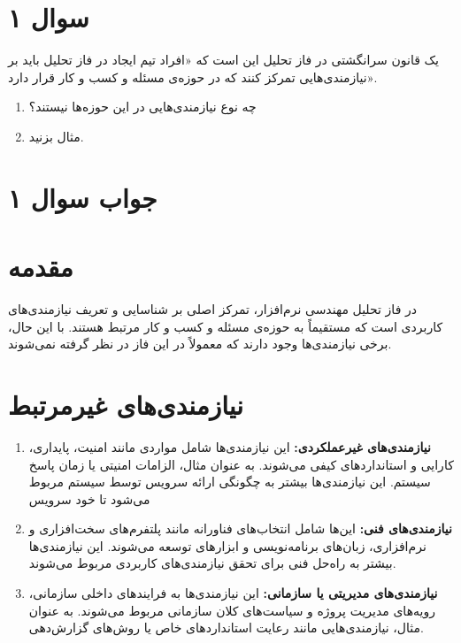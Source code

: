 \section*{سوال ۱}

یک قانون سرانگشتی در فاز تحلیل این است که «افراد تیم ایجاد در فاز تحلیل باید بر نیازمندی‌هایی تمرکز کنند که در حوزه‌ی مسئله و کسب و کار قرار دارد».
\begin{enumerate}
	\item چه نوع نیازمندی‌هایی در این حوزه‌ها نیستند؟
	\item مثال بزنید.
\end{enumerate}

\section*{جواب سوال ۱}

\section*{مقدمه}
در فاز تحلیل مهندسی نرم‌افزار، تمرکز اصلی بر شناسایی و تعریف نیازمندی‌های کاربردی است که مستقیماً به حوزه‌ی مسئله و کسب و کار مرتبط هستند. با این حال، برخی نیازمندی‌ها وجود دارند که معمولاً در این فاز در نظر گرفته نمی‌شوند.

\section*{نیازمندی‌های غیرمرتبط}
\begin{enumerate}
	
	\item \textbf{نیازمندی‌های غیرعملکردی:} این نیازمندی‌ها شامل مواردی مانند امنیت، پایداری، کارایی و استانداردهای کیفی می‌شوند. به عنوان مثال، الزامات امنیتی یا زمان پاسخ سیستم. این نیازمندی‌ها بیشتر به چگونگی ارائه سرویس توسط سیستم مربوط می‌شود تا خود سرویس
	
	\item \textbf{نیازمندی‌های فنی:} این‌ها شامل انتخاب‌های فناورانه مانند پلتفرم‌های سخت‌افزاری و نرم‌افزاری، زبان‌های برنامه‌نویسی و ابزارهای توسعه می‌شوند. این نیازمندی‌ها بیشتر به راه‌حل فنی برای تحقق نیازمندی‌های کاربردی مربوط می‌شوند.
	
	\item \textbf{نیازمندی‌های مدیریتی یا سازمانی:} این نیازمندی‌ها به فرایندهای داخلی سازمانی، رویه‌های مدیریت پروژه و سیاست‌های کلان سازمانی مربوط می‌شوند. به عنوان مثال، نیازمندی‌هایی مانند رعایت استانداردهای خاص یا روش‌های گزارش‌دهی.
	
\end{enumerate}

